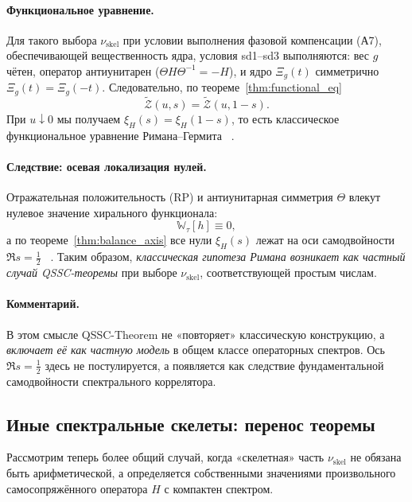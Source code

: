 \documentclass{article}
\numberwithin{equation}{section}
\theoremstyle{plain}
\theoremstyle{definition}
\theoremstyle{remark}
\begin{document}
\paragraph{Функциональное уравнение.}
Для такого выбора $\nu_{\mathrm{skel}}$ при условии выполнения фазовой компенсации (А7), обеспечивающей вещественность ядра, условия sd1–sd3 выполняются:
вес $g$ чётен, оператор антиунитарен ($\Theta H\Theta^{-1}=-H$),
и ядро $\Xi_g(t)$ симметрично $\Xi_g(t)=\Xi_g(-t)$.
Следовательно, по теореме~\ref{thm:functional_eq}
\begin{equation}
\label{eq:classical_FE}
\widetilde{\mathcal Z}(u,s)=\widetilde{\mathcal Z}(u,1-s).
\end{equation}
При $u\downarrow0$ мы получаем $\xi_H(s)=\xi_H(1-s)$, то есть классическое
функциональное уравнение Римана–Гермита ~\cite{Riemann1859}.

\paragraph{Следствие: осевая локализация нулей.}
Отражательная положительность (RP) и антиунитарная симметрия $\Theta$
влекут нулевое значение хирального функционала:
\begin{equation}
\mathbb W_\tau[h]\equiv 0,
\end{equation}
а по теореме~\ref{thm:balance_axis}
все нули $\xi_H(s)$ лежат на оси самодвойности $\Re s=\tfrac12$ ~\cite{Montgomery1973}.
Таким образом, \emph{классическая гипотеза Римана возникает как частный случай QSSC-теоремы}
при выборе $\nu_{\mathrm{skel}}$, соответствующей простым числам.

\paragraph{Комментарий.}
В этом смысле QSSC-Theorem не «повторяет» классическую конструкцию,
а \emph{включает её как частную модель} в общем классе операторных спектров.
Ось $\Re s=\tfrac12$ здесь не постулируется, а появляется как следствие
фундаментальной самодвойности спектрального коррелятора.

\subsection{Иные спектральные скелеты: перенос теоремы}
\label{subsec:other_spectra}

Рассмотрим теперь более общий случай, когда «скелетная» часть $\nu_{\mathrm{skel}}$
не обязана быть арифметической, а определяется собственными значениями произвольного
самосопряжённого оператора $H$ с компактен спектром.
\end{document}
